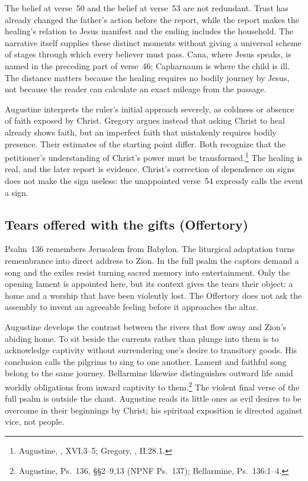 The belief at verse~50 and the belief at verse~53 are not redundant.
Trust has already changed the father's action before the report, while
the report makes the healing's relation to Jesus manifest and the ending
includes the household. The narrative itself supplies these distinct
moments without giving a universal scheme of stages through which every
believer must pass. Cana, where Jesus speaks, is named in the preceding
part of verse~46; Capharnaum is where the child is ill. The distance matters
because the healing requires no bodily journey by Jesus, not because the
reader can calculate an exact mileage from the passage.

Augustine interprets the ruler's initial approach severely, as coldness
or absence of faith exposed by Christ. Gregory argues instead that asking
Christ to heal already shows faith, but an imperfect faith that mistakenly
requires bodily presence. Their estimates of the starting point differ.
Both recognize that the petitioner's understanding of Christ's power must
be transformed.\footnote{Augustine, , XVI.3--5;
Gregory, , II.28.1.}
The healing is real, and the later report is evidence. Christ's correction
of dependence on signs does not make the sign useless: the unappointed
verse~54 expressly calls the event a sign.

\subsection{Tears offered with the gifts (Offertory)}
Psalm~136 remembers Jerusalem from Babylon. The liturgical adaptation
turns remembrance into direct address to Zion. In the full psalm the
captors demand a song and the exiles resist turning sacred memory into
entertainment. Only the opening lament is appointed here, but its context
gives the tears their object: a home and a worship that have been violently
lost. The Offertory does not ask the assembly to invent an agreeable
feeling before it approaches the altar.

Augustine develops the contrast between the rivers that flow away and
Zion's abiding home. To sit beside the currents rather than plunge into
them is to acknowledge captivity without surrendering one's desire to
transitory goods. His conclusion calls the pilgrims to sing to one
another. Lament and faithful song belong to the same journey.
Bellarmine likewise distinguishes outward life amid worldly obligations
from inward captivity to them.\footnote{Augustine, Ps.~136, \S\S2--9,13
(NPNF Ps.~137); Bellarmine, Ps.~136:1--4.}
The violent final verse of the full psalm is outside the chant. Augustine
reads its little ones as evil desires to be overcome in their beginnings
by Christ; his spiritual exposition is directed against vice, not people.


